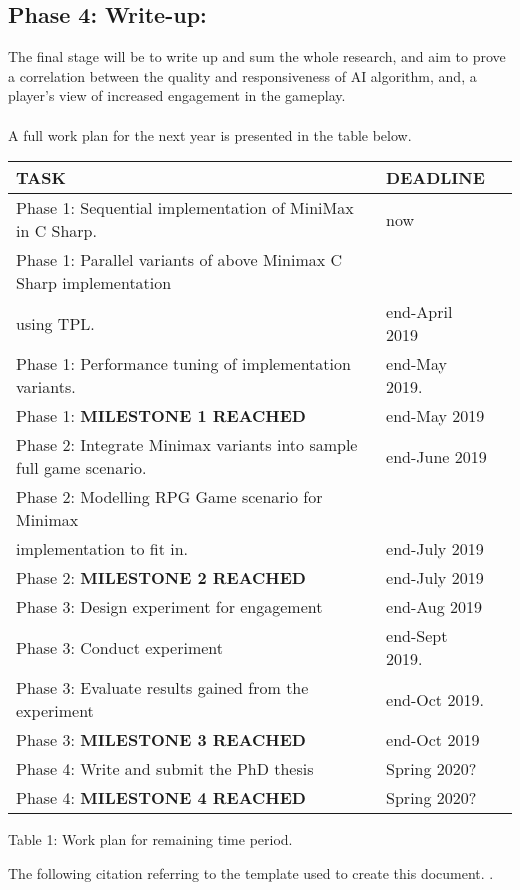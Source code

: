 \documentclass[12pt]{article}
\begin{document}
\subsection{Phase 4: Write-up:}
The final stage will be to write up and sum the whole research, and aim to prove a correlation between the quality and responsiveness of AI algorithm, and, a player's view of increased engagement in the gameplay. \\\\
A full work plan for the next year is presented in the table below.
\begin{center}
    \begin{tabular}{ | l | l | p{6cm} |}
    \hline
    \textbf{TASK} & \textbf{DEADLINE}
    \\ \hline
  \colorbox{blue!30}{Phase 1:} Sequential implementation of MiniMax in C Sharp. & now \\ \hline
    \colorbox{blue!30}{Phase 1:} Parallel variants of above Minimax C Sharp implementation \\ using TPL. & end-April 2019 \\ \hline
   \colorbox{blue!30}{Phase 1:} Performance tuning of implementation variants. & end-May 2019.  \\ \hline
    \colorbox{blue!30}{Phase 1:} \textbf{MILESTONE 1 REACHED} & end-May 2019 \\ \hline
   \colorbox{green!30}{Phase 2:} Integrate Minimax variants into sample full game scenario.    
      & end-June 2019 \\ \hline
   \colorbox{green!30}{Phase 2:}   Modelling RPG Game scenario for Minimax \\ implementation to fit in. & end-July 2019
    \\ \hline
    \colorbox{green!30}{Phase 2:} \textbf{MILESTONE 2 REACHED} & end-July 2019  \\ \hline
   \colorbox{orange!30}{Phase 3:}  Design experiment for engagement & end-Aug 2019  \\ \hline
         \colorbox{orange!30}{Phase 3:} Conduct experiment & end-Sept 2019.  
    \\ \hline     
 \colorbox{orange!30}{Phase 3:} Evaluate results gained from the experiment & end-Oct 2019. \\ \hline
 \colorbox{orange!30}{Phase 3:} \textbf{MILESTONE 3 REACHED} & end-Oct 2019  \\ \hline
 \colorbox{gray!30}{Phase 4:} Write and submit the PhD thesis  & Spring 2020? \\ \hline
  \colorbox{gray!30}{Phase 4:} \textbf{MILESTONE 4 REACHED} & Spring 2020?  \\ \hline
    \end{tabular}
    Table 1: Work plan for remaining time period.
\end{center}
The following citation referring to the template used to create this document. \cite{Gil:02}.


\end{document}
